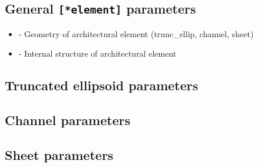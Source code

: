 \documentclass[letterpaper,10pt,english]{sphinxmanual}
\begin{document}
\subsection{General \texttt{{[}*element{]}} parameters}
\label{example:general-element-parameters}\begin{itemize}
\item {} 
                  - Geometry of architectural element (trunc\_ellip, channel, sheet)

\item {} 
                 - Internal structure of architectural element

\end{itemize}


\subsection{Truncated ellipsoid parameters}
\label{example:truncated-ellipsoid-parameters}

\subsection{Channel parameters}
\label{example:channel-parameters}

\subsection{Sheet parameters}
\label{example:sheet-parameters}
\end{document}
